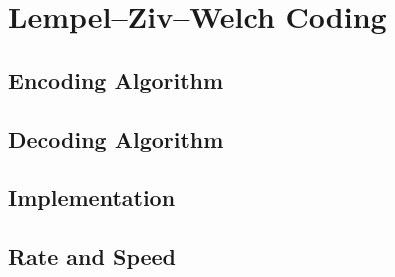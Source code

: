 \documentclass[a4paper, twocolumn]{article}
\begin{document}
    \section{Lempel--Ziv--Welch Coding} \label{sec:lempel_ziv_welch}
        \subsection{Encoding Algorithm} \label{sec:lzw_encoding_algorithm}
        \subsection{Decoding Algorithm} \label{sec:lzw_decoding_algorithm}
        \subsection{Implementation} \label{sec:lzw_implementation}
        \subsection{Rate and Speed} \label{sec:lzw_rate_and_speed}
\end{document}
